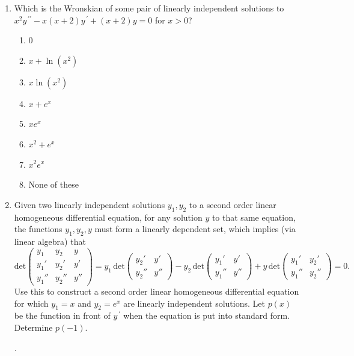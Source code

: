 \documentclass{ximera}
\begin{document}
\begin{enumerate}[label=(\arabic*)]
\newpage

\item Which is the Wronskian of some pair of linearly independent solutions to $x^2y^{\,\prime\prime}-x(x+2)y^{\,\prime}+(x+2)y=0$ for $x>0$?

\begin{enumerate}[label=(\alph*)]
\item $0$
\item $x+\ln (x^2)$
\item $x\ln (x^2)$
\item $x+e^x$
\item $xe^x$
\item $x^2+e^x$
\item $x^2e^x$ %
\item None of these
\end{enumerate}



\item Given two linearly independent solutions $y_1,y_2$ to a second order linear homogeneous differential equation, for any solution $y$ to that same equation, the functions $y_1,y_2,y$ must form a linearly dependent set, which implies (via linear algebra) that 
$$\displaystyle
\mathrm{det}\left(\begin{array}{ccc} y_1 & y_2 & y\\ y_1' & y_2'  & y'\\ y_1'' & y_2'' & y''\end{array}\right) = y_1\,\mathrm{det}\left(\begin{array}{cc} y_2' & y'\\ y_2'' & y'' \end{array}\right)-y_2\,\mathrm{det}\left(\begin{array}{cc} y_1' & y'\\ y_1'' & y'' \end{array}\right) + y\,\mathrm{det}\left(\begin{array}{cc} y_1' & y_2'\\ y_1'' & y_2'' \end{array}\right)=0.$$  Use this to construct a second order linear homogeneous differential equation for which $y_1=x$ and $y_2=e^x$ are linearly independent solutions.  Let $p(x)$ be the function in front of $y^{\,\prime}$ when the equation is put into standard form.  Determine $p(-1)$.

.




\end{enumerate}
\end{document}
